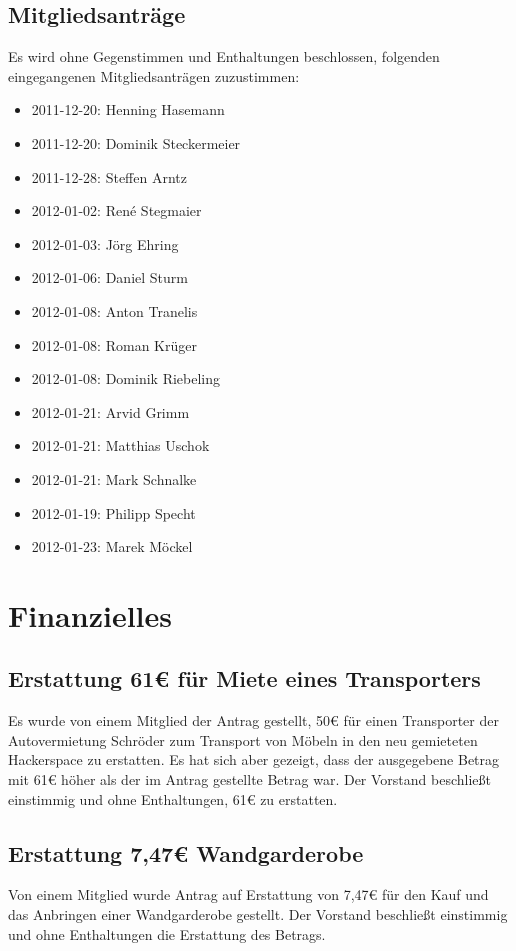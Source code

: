 \documentclass[a4paper,12pt]{scrartcl}
\begin{document}
\subsection{Mitgliedsanträge}
Es wird ohne Gegenstimmen und Enthaltungen beschlossen, folgenden eingegangenen
Mitgliedsanträgen zuzustimmen:
\begin{itemize}
 \item 2011-12-20: Henning Hasemann
 \item 2011-12-20: Dominik Steckermeier
 \item 2011-12-28: Steffen Arntz
 \item 2012-01-02: René Stegmaier
 \item 2012-01-03: Jörg Ehring
 \item 2012-01-06: Daniel Sturm
 \item 2012-01-08: Anton Tranelis
 \item 2012-01-08: Roman Krüger
 \item 2012-01-08: Dominik Riebeling
 \item 2012-01-21: Arvid Grimm
 \item 2012-01-21: Matthias Uschok
 \item 2012-01-21: Mark Schnalke
 \item 2012-01-19: Philipp Specht
 \item 2012-01-23: Marek Möckel
\end{itemize}

\section{Finanzielles}
\subsection{Erstattung 61€ für Miete eines Transporters}
Es wurde von einem Mitglied der Antrag gestellt, 50€ für einen Transporter der
Autovermietung Schröder zum Transport von Möbeln in den neu gemieteten
Hackerspace zu erstatten. Es hat sich aber gezeigt, dass der ausgegebene Betrag
mit 61€ höher als der im Antrag gestellte Betrag war. Der Vorstand beschließt
einstimmig und ohne Enthaltungen, 61€ zu erstatten.
 
\subsection{Erstattung 7{,}47€ Wandgarderobe}
Von einem Mitglied wurde Antrag auf Erstattung von 7{,}47€ für den Kauf und das
Anbringen einer Wandgarderobe gestellt. Der Vorstand beschließt einstimmig und
ohne Enthaltungen die Erstattung des Betrags.
\end{document}
